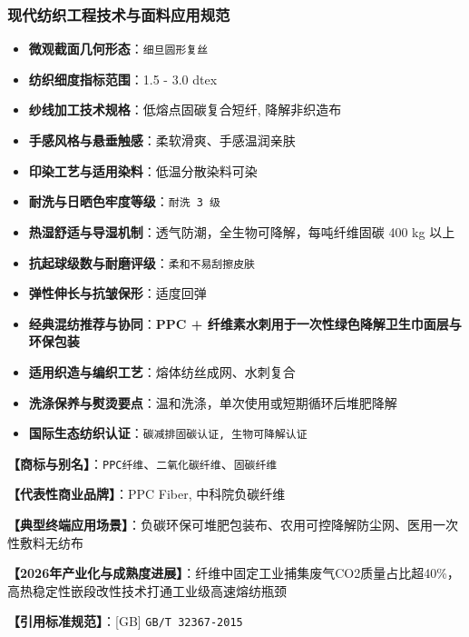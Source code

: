 \documentclass[11pt,openright,twoside,UTF8]{ctexbook}
\begin{document}
\subsubsection*{现代纺织工程技术与面料应用规范}
\begin{itemize} \setlength{\itemsep}{2pt}
    \item \textbf{微观截面几何形态}：\texttt{细旦圆形复丝}
    \item \textbf{纺织细度指标范围}：1.5 - 3.0 dtex
    \item \textbf{纱线加工技术规格}：低熔点固碳复合短纤, 降解非织造布
    \item \textbf{手感风格与悬垂触感}：柔软滑爽、手感温润亲肤
    \item \textbf{印染工艺与适用染料}：低温分散染料可染
    \item \textbf{耐洗与日晒色牢度等级}：\texttt{耐洗 3 级}
    \item \textbf{热湿舒适与导湿机制}：透气防潮，全生物可降解，每吨纤维固碳 400 kg 以上
    \item \textbf{抗起球级数与耐磨评级}：\texttt{柔和不易刮擦皮肤}
    \item \textbf{弹性伸长与抗皱保形}：适度回弹
    \item \textbf{经典混纺推荐与协同}：\textbf{PPC + 纤维素水刺用于一次性绿色降解卫生巾面层与环保包装}
    \item \textbf{适用织造与编织工艺}：熔体纺丝成网、水刺复合
    \item \textbf{洗涤保养与熨烫要点}：温和洗涤，单次使用或短期循环后堆肥降解
    \item \textbf{国际生态纺织认证}：\texttt{碳减排固碳认证, 生物可降解认证}
\end{itemize}
\vspace{0.2cm}

\noindent\textbf{【商标与别名】}：\texttt{PPC纤维}、\texttt{二氧化碳纤维}、\texttt{固碳纤维}\par
\noindent\textbf{【代表性商业品牌】}：PPC Fiber, 中科院负碳纤维\par
\noindent\textbf{【典型终端应用场景】}：负碳环保可堆肥包装布、农用可控降解防尘网、医用一次性敷料无纺布\par
\noindent\textbf{【2026年产业化与成熟度进展】}：纤维中固定工业捕集废气CO2质量占比超40\%，高热稳定性嵌段改性技术打通工业级高速熔纺瓶颈\par
\noindent\textbf{【引用标准规范】}：[GB] \texttt{GB/T 32367-2015}\par
\vspace{0.5cm}
\end{document}
